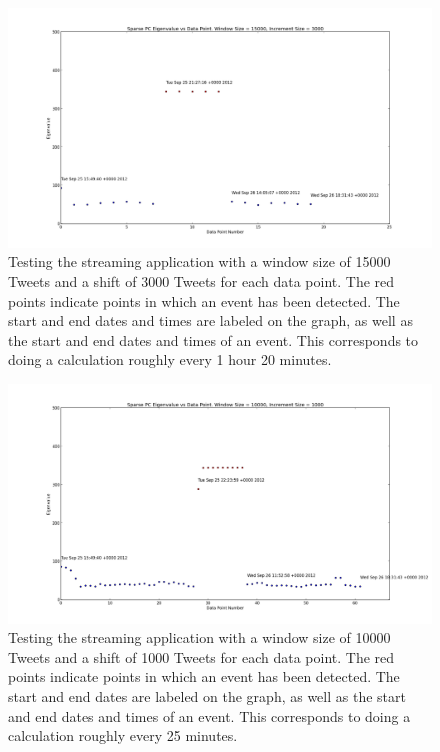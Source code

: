 \documentclass[11pt,a4paper]{article}
\begin{document}
\begin{figure}[H]
\centering
\includegraphics[scale=0.25]{Testing_Streaming_App_15000_3000.png}
\caption{Testing the streaming application with a window size of 15000 Tweets and a shift of 3000 Tweets for each data point. The red points indicate points in which an event has been detected. The start and end dates and times are labeled on the graph, as well as the start and end dates and times of an event. This corresponds to doing a calculation roughly every 1 hour 20 minutes.}
\label{testing_app_15000}
\end{figure}

\begin{figure}[H]
\centering
\includegraphics[scale=0.25]{Testing_Streaming_App_10000_1000.png}
\caption{Testing the streaming application with a window size of 10000 Tweets and a shift of 1000 Tweets for each data point. The red points indicate points in which an event has been detected. The start and end dates are labeled on the graph, as well as the start and end dates and times of an event. This corresponds to doing a calculation roughly every  25 minutes.}
\label{testing_app_10000}
\end{figure}
\end{document}
